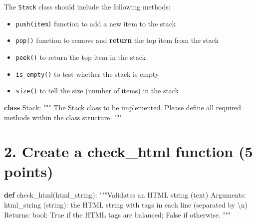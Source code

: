 \documentclass[
  letterpaper,
]{scrbook}
\newenvironment{Shaded}{\begin{snugshade}}{\end{snugshade}}
\newcommand{\CharTok}[1]{\textcolor[rgb]{0.13,0.47,0.30}{#1}}
\newcommand{\CommentTok}[1]{\textcolor[rgb]{0.37,0.37,0.37}{#1}}
\newcommand{\KeywordTok}[1]{\textcolor[rgb]{0.00,0.23,0.31}{\textbf{#1}}}
\newcommand{\NormalTok}[1]{\textcolor[rgb]{0.00,0.23,0.31}{#1}}
\providecommand{\tightlist}{%
  \setlength{\itemsep}{0pt}\setlength{\parskip}{0pt}}
\begin{document}

The \texttt{Stack} class should include the following methods:

\begin{itemize}
\tightlist
\item
  \texttt{push(item)} function to add a new item to the stack
\item
  \texttt{pop()} function to remove and \textbf{return} the top item
  from the stack
\item
  \texttt{peek()} to return the top item in the stack
\item
  \texttt{is\_empty()} to test whether the stack is empty
\item
  \texttt{size()} to tell the size (number of items) in the stack
\end{itemize}

\begin{Shaded}
\begin{Highlighting}[]
\KeywordTok{class}\NormalTok{ Stack: }
    \CommentTok{"""}
\CommentTok{    The Stack class to be implemented. }
\CommentTok{    Please define all required methods }
\CommentTok{    within the class structure. }
\CommentTok{    """}
\end{Highlighting}
\end{Shaded}

\section*{2. Create a check\_html function (5
points)}\label{create-a-check_html-function-5-points}


\begin{Shaded}
\begin{Highlighting}[]
\KeywordTok{def}\NormalTok{ check\_html(html\_string):}
    \CommentTok{"""Validates an HTML string (text)}
\CommentTok{    Arguments: }
\CommentTok{        html\_string (string): the HTML string with tags in each line (separated by }\CharTok{\textbackslash{}n}\CommentTok{)}
\CommentTok{        }
\CommentTok{    Returns: }
\CommentTok{        bool: True if the HTML tags are balanced; False if otherwise. }
\CommentTok{    """}
\end{Highlighting}
\end{Shaded}
\end{document}
